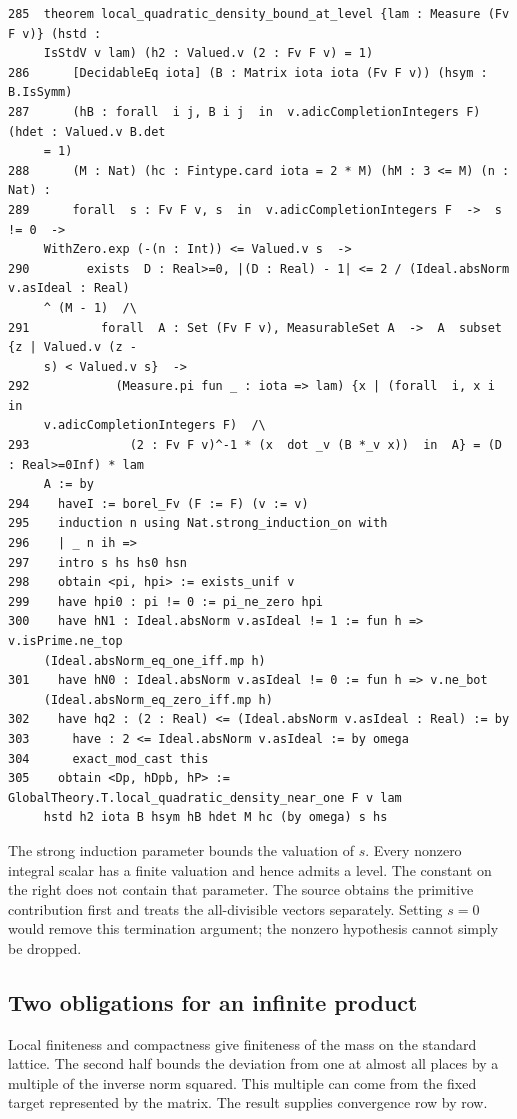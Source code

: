 \documentclass[12pt,letterpaper]{article}
\begin{document}
{\footnotesize\begin{verbatim}
285  theorem local_quadratic_density_bound_at_level {lam : Measure (Fv F v)} (hstd :
     IsStdV v lam) (h2 : Valued.v (2 : Fv F v) = 1)
286      [DecidableEq iota] (B : Matrix iota iota (Fv F v)) (hsym : B.IsSymm)
287      (hB : forall  i j, B i j  in  v.adicCompletionIntegers F) (hdet : Valued.v B.det
     = 1)
288      (M : Nat) (hc : Fintype.card iota = 2 * M) (hM : 3 <= M) (n : Nat) :
289      forall  s : Fv F v, s  in  v.adicCompletionIntegers F  ->  s != 0  ->
     WithZero.exp (-(n : Int)) <= Valued.v s  ->
290        exists  D : Real>=0, |(D : Real) - 1| <= 2 / (Ideal.absNorm v.asIdeal : Real)
     ^ (M - 1)  /\
291          forall  A : Set (Fv F v), MeasurableSet A  ->  A  subset  {z | Valued.v (z -
     s) < Valued.v s}  ->
292            (Measure.pi fun _ : iota => lam) {x | (forall  i, x i  in
     v.adicCompletionIntegers F)  /\
293              (2 : Fv F v)^-1 * (x  dot _v (B *_v x))  in  A} = (D : Real>=0Inf) * lam
     A := by
294    haveI := borel_Fv (F := F) (v := v)
295    induction n using Nat.strong_induction_on with
296    | _ n ih =>
297    intro s hs hs0 hsn
298    obtain <pi, hpi> := exists_unif v
299    have hpi0 : pi != 0 := pi_ne_zero hpi
300    have hN1 : Ideal.absNorm v.asIdeal != 1 := fun h => v.isPrime.ne_top
     (Ideal.absNorm_eq_one_iff.mp h)
301    have hN0 : Ideal.absNorm v.asIdeal != 0 := fun h => v.ne_bot
     (Ideal.absNorm_eq_zero_iff.mp h)
302    have hq2 : (2 : Real) <= (Ideal.absNorm v.asIdeal : Real) := by
303      have : 2 <= Ideal.absNorm v.asIdeal := by omega
304      exact_mod_cast this
305    obtain <Dp, hDpb, hP> := GlobalTheory.T.local_quadratic_density_near_one F v lam
     hstd h2 iota B hsym hB hdet M hc (by omega) s hs
\end{verbatim}
}

The strong induction parameter bounds the valuation of \(s\). Every nonzero integral scalar has a finite valuation and hence admits a level. The constant on the right does not contain that parameter. The source obtains the primitive contribution first and treats the all-divisible vectors separately. Setting \(s=0\) would remove this termination argument; the nonzero hypothesis cannot simply be dropped.

\clearpage\subsection*{Two obligations for an infinite product}

Local finiteness and compactness give finiteness of the mass on the standard lattice. The second half bounds the deviation from one at almost all places by a multiple of the inverse norm squared. This multiple can come from the fixed target represented by the matrix. The result supplies convergence row by row.
\end{document}
